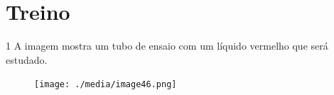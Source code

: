 










\pagebreak
\section*{Treino}

\num{1} A imagem mostra um tubo de ensaio com um líquido vermelho que será estudado.


\begin{figure}[H]
\centering
\texttt{[image: ./media/image46.png]}
\end{figure}

